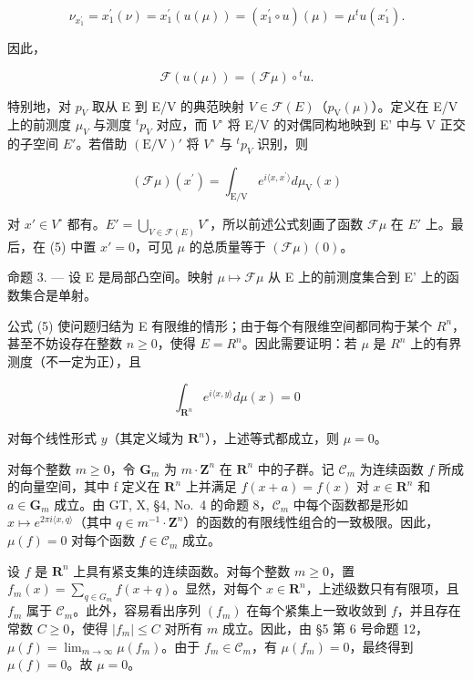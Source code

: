 \[
\nu_ {x _ {1} ^ {\prime}} = x _ {1} ^ {\prime} (\nu) = x _ {1} ^ {\prime} (u (\mu)) = \left(x _ {1} ^ {\prime} \circ u\right) (\mu) = \mu^ {t} u \left(x _ {1} ^ {\prime}\right).
\]

因此，

\[
\mathscr {F} (u (\mu)) = (\mathscr {F} \mu) \circ {} ^ {t} u.\tag{4}
\]

特别地，对 \(p_{V}\) 取从 E 到 E/V 的典范映射 \(V \in \mathcal{F}(E)\)（\(p_{\mathrm{V}}(\mu)\)）。定义在 E/V 上的前测度 \(\mu_{V}\) 与测度 \(^{t}p_{V}\) 对应，而 \(V^{\circ}\) 将 E/V 的对偶同构地映到 E' 中与 V 正交的子空间 \(E'\)。若借助 \((\mathrm{E}/\mathrm{V})'\) 将 \(V^{\circ}\) 与 \(^{t}p_{V}\) 识别，则

\[
(\mathcal {F} \mu) (x ^ {\prime}) = \int_ {\mathrm{E} / \mathrm{V}} e ^ {i \langle x, x ^ {\prime} \rangle} d \mu_ {\mathrm{V}} (x)\tag{5}
\]

对 \(x' \in V^{\circ}\) 都有。\(E' = \bigcup_{V \in \mathcal{F}(E)} V^{\circ}\)，所以前述公式刻画了函数 \(\mathcal{F}\mu\) 在 \(E'\) 上。最后，在 (5) 中置 \(x' = 0\)，可见 \(\mu\) 的总质量等于 \((\mathcal{F}\mu)(0)\)。

命题 3. --- 设 E 是局部凸空间。映射 \(\mu \mapsto \mathcal{F}\mu\) 从 E 上的前测度集合到 E' 上的函数集合是单射。

公式 (5) 使问题归结为 E 有限维的情形；由于每个有限维空间都同构于某个 \(R^{n}\)，甚至不妨设存在整数 \(n \geqslant 0\)，使得 \(E = R^{n}\)。因此需要证明：若 \(\mu\) 是 \(R^{n}\) 上的有界测度（不一定为正），且

\[
\int_ {\mathbf {R} ^ {n}} e ^ {i \langle x, y \rangle} d \mu (x) = 0
\]

对每个线性形式 \(y\)（其定义域为 \(\mathbf{R}^n\)），上述等式都成立，则 \(\mu = 0\)。

对每个整数 \(m \geqslant 0\)，令 \(\mathbf{G}_m\) 为 \(m \cdot \mathbf{Z}^n\) 在 \(\mathbf{R}^n\) 中的子群。记 \(\mathcal{C}_m\) 为连续函数 \(f\) 所成的向量空间，其中 f 定义在 \(\mathbf{R}^n\) 上并满足 \(f(x + a) = f(x)\) 对 \(x \in \mathbf{R}^n\) 和 \(a \in \mathbf{G}_m\) 成立。由 GT, X, §4, No.~4 的命题 8，\(\mathcal{C}_m\) 中每个函数都是形如 \(x \mapsto e^{2\pi i\langle x,q\rangle}\)（其中 \(q \in m^{-1} \cdot \mathbf{Z}^n\)）的函数的有限线性组合的一致极限。因此，\(\mu(f) = 0\) 对每个函数 \(f \in \mathcal{C}_m\) 成立。

设 \(f\) 是 \(\mathbf{R}^n\) 上具有紧支集的连续函数。对每个整数 \(m \geqslant 0\)，置 \(f_m(x) = \sum_{q \in G_m} f(x + q)\)。显然，对每个 \(x \in \mathbf{R}^n\)，上述级数只有有限项，且 \(f_m\) 属于 \(\mathcal{C}_m\)。此外，容易看出序列 \((f_m)\) 在每个紧集上一致收敛到 \(f\)，并且存在常数 \(C \geqslant 0\)，使得 \(|f_m| \leqslant C\) 对所有 \(m\) 成立。因此，由 §5 第 6 号命题 12，\(\mu(f) = \lim_{m \to \infty} \mu(f_m)\)。由于 \(f_m \in \mathcal{C}_m\)，有 \(\mu(f_m) = 0\)，最终得到 \(\mu(f) = 0\)。故 \(\mu = 0\)。

